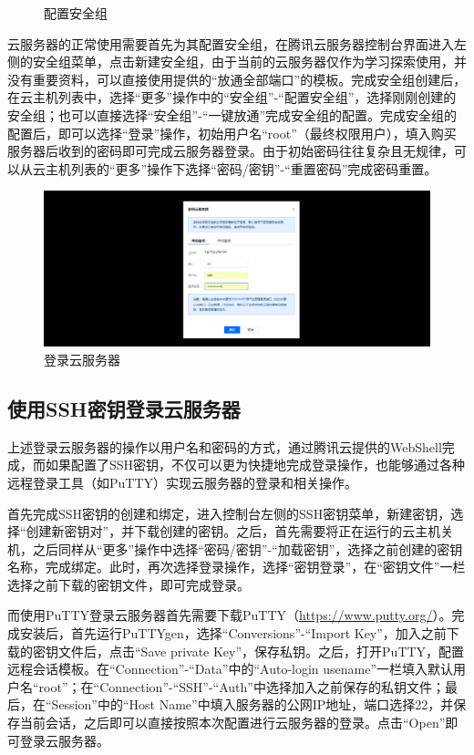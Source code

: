 \documentclass[a4paper,11pt]{ctexart}
\begin{document}
\begin{spacing}{1.5}
\begin{figure}[h]
	\caption{配置安全组}\label{figure:安全组3}
\end{figure}
\par
云服务器的正常使用需要首先为其配置安全组，在腾讯云服务器控制台界面进入左侧的安全组菜单，点击新建安全组，由于当前的云服务器仅作为学习探索使用，并没有重要资料，可以直接使用提供的“放通全部端口”的模板。完成安全组创建后，在云主机列表中，选择“更多”操作中的“安全组”-“配置安全组”，选择刚刚创建的安全组；也可以直接选择“安全组”-“一键放通”完成安全组的配置。完成安全组的配置后，即可以选择“登录”操作，初始用户名“root”（最终权限用户），填入购买服务器后收到的密码即可完成云服务器登录。由于初始密码往往复杂且无规律，可以从云主机列表的“更多”操作下选择“密码/密钥”-“重置密码”完成密码重置。
\begin{figure}[h]
	\centering
	\setlength{\abovecaptionskip}{2mm}
	\setlength{\belowcaptionskip}{-2mm}
	\includegraphics[scale=0.25]{登录1.png}
	\caption{登录云服务器}\label{figure:登录1}
\end{figure}
\subsection{使用SSH密钥登录云服务器}
\par
上述登录云服务器的操作以用户名和密码的方式，通过腾讯云提供的WebShell完成，而如果配置了SSH密钥，不仅可以更为快捷地完成登录操作，也能够通过各种远程登录工具（如PuTTY）实现云服务器的登录和相关操作。
\par
首先完成SSH密钥的创建和绑定，进入控制台左侧的SSH密钥菜单，新建密钥，选择“创建新密钥对”，并下载创建的密钥。之后，首先需要将正在运行的云主机关机，之后同样从“更多”操作中选择“密码/密钥”-“加载密钥”，选择之前创建的密钥名称，完成绑定。此时，再次选择登录操作，选择“密钥登录”，在“密钥文件”一栏选择之前下载的密钥文件，即可完成登录。
\par
而使用PuTTY登录云服务器首先需要下载PuTTY（\url{https://www.putty.org/}）。完成安装后，首先运行PuTTYgen，选择“Conversions”-“Import Key”，加入之前下载的密钥文件后，点击“Save private Key”，保存私钥。之后，打开PuTTY，配置远程会话模板。在“Connection”-“Data”中的“Auto-login usename”一栏填入默认用户名“root”；在“Connection”-“SSH”-“Auth”中选择加入之前保存的私钥文件；最后，在“Session”中的“Host Name”中填入服务器的公网IP地址，端口选择22，并保存当前会话，之后即可以直接按照本次配置进行云服务器的登录。点击“Open”即可登录云服务器。

\end{spacing}
\end{document}
